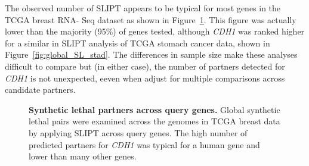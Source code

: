 The observed number of \gls{SLIPT} appears to be typical for most genes in the \gls{TCGA} breast \acrshort{RNA}- Seq dataset as shown in Figure~\ref{fig:global_SL}. This figure was actually lower than the majority (95\%) of genes tested, although \textit{CDH1} was ranked higher for a similar in \gls{SLIPT} analysis of \gls{TCGA} stomach cancer data, shown in Figure~\ref{fig:global_SL_stad}. The differences in sample size make these analyses difficult to compare but (in either case), the number of partners detected for \textit{CDH1} is not unexpected, eeven when adjust for multiple comparisons across candidate partners.

\begin{figure}[!ht]
  \begin{center}
   \end{center}
   \caption[Synthetic lethal partners across query genes]{\small \textbf{Synthetic lethal partners across query genes.} Global \gls{synthetic lethal} pairs were examined across the \glspl{genome} in \gls{TCGA} breast  data by applying \gls{SLIPT} across query genes. The high number of predicted partners for \textit{CDH1} was typical for a human gene and lower than many other genes.
   }
\label{fig:global_SL}
\end{figure}

